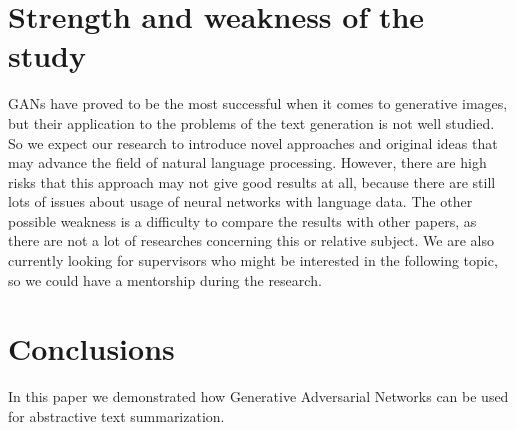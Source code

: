 \documentclass[sigplan]{acmart}
\begin{document}


\section{Strength and weakness of the study}
GANs have proved to be the most successful when it comes to generative images, but their application to the problems of the text generation is not well studied. So we expect our research to introduce novel approaches and original ideas that may advance the field of natural language processing.
However, there are high risks that this approach may not give good results at all, because there are still lots of issues about  usage of neural networks with language data. The other possible weakness is a difficulty to compare the results with other papers, as there are not a lot of researches concerning this or relative subject. 
We are also currently looking for supervisors who might be interested in the following topic, so we could have a mentorship during the research.

\section*{Conclusions}

In this paper we demonstrated how Generative Adversarial Networks can be used for abstractive text summarization.





\end{document}
